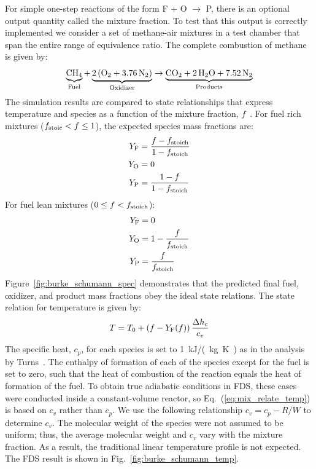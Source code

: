 \documentclass[11pt]{book}
\begin{document}
For simple one-step reactions of the form F + O $\rightarrow$ P, there is an optional output quantity called the mixture fraction. To test that this output is correctly implemented we consider a set of methane-air mixtures in a test chamber that span the entire range of equivalence ratio. The complete combustion of methane is given by:
\begin{equation}\label{eq:methane_ex2}
\underbrace{\mathrm{CH}_4}_{\rm Fuel} + \underbrace{\mathrm{2\,(O_2 + 3.76\,N_2)}}_{\rm Oxidizer} \rightarrow  \underbrace{\mathrm{CO_2 + 2\, H_2O + 7.52\,N_2}}_{\rm Products}
\end{equation}
The simulation results are compared to state relationships that express temperature and species as a function of the mixture fraction, $f$~\cite{Turns:1996}. For fuel rich mixtures ($f_{\rm stoic} < f \le 1$), the expected species mass fractions are:
\begin{align}\label{eq:mix_relate_rich}
Y_{\rm F} &= \frac{f-f_{\rm stoich}}{1-f_{\rm stoich}} \\
Y_{\rm O} &= 0 \\
Y_{\rm P} &= \frac{1-f}{1-f_{\rm stoich}}
\end{align}
For fuel lean mixtures ($0 \le f < f_{\rm stoich}$):
\begin{align}\label{eq:mix_relate_lean}
Y_{\rm F} &= 0 \\
Y_{\rm O} &= 1- \frac{f}{f_{\rm stoich}} \\
Y_{\rm P} &= \frac{f}{f_{\rm stoich}}
\end{align}
Figure~\ref{fig:burke_schumann_spec} demonstrates that the predicted final fuel, oxidizer, and product mass fractions obey the ideal state relations. The state relation for temperature is given by:
\begin{equation}\label{eq:mix_relate_temp}
T = T_0 +  (f-Y_{\rm F}(f)) \, \frac{\Delta h_{\rm c}}{c_{v}}
\end{equation}
The specific heat, $c_p$, for each species is set to 1~\unit{kJ/(kg.K)} as in the analysis by Turns~\cite{Turns:1996}. The enthalpy of formation of each of the species except for the fuel is set to zero, such that the heat of combustion of the reaction equals the heat of formation of the fuel. To obtain true adiabatic conditions in FDS, these cases were conducted inside a constant-volume reactor, so Eq.~(\ref{eq:mix_relate_temp}) is based on $c_v$ rather than $c_p$. We use the  following relationship $c_v = c_p - R/W$ to determine $c_v$. The molecular weight of the species were not assumed to be uniform; thus, the average molecular weight and $c_v$ vary with the mixture fraction. As a result, the traditional linear temperature profile is not expected.  The FDS result is shown in Fig.~\ref{fig:burke_schumann_temp}.
\end{document}
